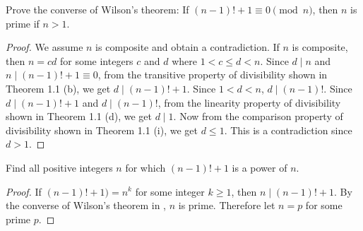 \begin{exercise}{7}{}
  Prove the converse of Wilson's theorem: If \( (n - 1)! + 1 \equiv 0
  \pmod{n} \), then \( n \) is prime if \( n > 1 \).
\end{exercise}

\begin{proof}
  We assume \( n \) is composite and obtain a contradiction. If \( n
  \) is composite, then \( n = cd \) for some integers \( c \) and \(
  d \) where \( 1 < c \le d < n \). Since \( d \mid n \) and \( n \mid
  (n - 1)! + 1 \equiv 0 \), from the transitive property of
  divisibility shown in Theorem 1.1 (b), we get \( d \mid (n - 1)! + 1
  \). Since \( 1 < d < n \), \( d \mid (n - 1)! \). Since \( d \mid (n
  - 1)! + 1 \) and \( d \mid (n - 1)! \), from the linearity property
  of divisibility shown in Theorem 1.1 (d), we get \( d \mid 1 \). Now
  from the comparison property of divisibility shown in Theorem 1.1
  (i), we get \( d \le 1 \). This is a contradiction since \( d > 1
  \).
\end{proof}


\begin{exercise}{8}{}
  Find all positive integers \( n \) for which \( (n - 1)! + 1 \) is a
  power of \( n \).
\end{exercise}

\begin{proof}
  If \( (n - 1)! + 1 ) = n^k \) for some integer \( k \ge 1 \), then
  \( n \mid (n - 1)! + 1 \). By the converse of Wilson's theorem in
  , \( n \) is prime. Therefore let \( n = p \) for some
  prime \( p \).
\end{proof}
